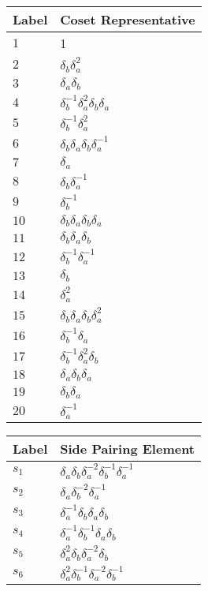 \documentclass{article}
\begin{document}
\begin{center}
\begin{tabular}{ll}
\toprule
Label & Coset Representative\\
\midrule
$1$ & 1 \\
$2$ & $\delta_b^{}\delta_a^{2}$ \\
$3$ & $\delta_a^{}\delta_b^{}$ \\
$4$ & $\delta_b^{-1}\delta_a^{2}\delta_b^{}\delta_a^{}$ \\
$5$ & $\delta_b^{-1}\delta_a^{2}$ \\
$6$ & $\delta_b^{}\delta_a^{}\delta_b^{}\delta_a^{-1}$ \\
$7$ & $\delta_a^{}$ \\
$8$ & $\delta_b^{}\delta_a^{-1}$ \\
$9$ & $\delta_b^{-1}$ \\
$10$ & $\delta_b^{}\delta_a^{}\delta_b^{}\delta_a^{}$ \\
$11$ & $\delta_b^{}\delta_a^{}\delta_b^{}$ \\
$12$ & $\delta_b^{-1}\delta_a^{-1}$ \\
$13$ & $\delta_b^{}$ \\
$14$ & $\delta_a^{2}$ \\
$15$ & $\delta_b^{}\delta_a^{}\delta_b^{}\delta_a^{2}$ \\
$16$ & $\delta_b^{-1}\delta_a^{}$ \\
$17$ & $\delta_b^{-1}\delta_a^{2}\delta_b^{}$ \\
$18$ & $\delta_a^{}\delta_b^{}\delta_a^{}$ \\
$19$ & $\delta_b^{}\delta_a^{}$ \\
$20$ & $\delta_a^{-1}$ \\
\bottomrule
\end{tabular}
\hfill
\begin{tabular}{ll}
\toprule
Label & Side Pairing Element\\
\midrule
$s_{1}$ & $\delta_a^{}\delta_b^{}\delta_a^{-2}\delta_b^{-1}\delta_a^{-1}$ \\
$s_{2}$ & $\delta_a^{}\delta_b^{-2}\delta_a^{-1}$ \\
$s_{3}$ & $\delta_a^{-1}\delta_b^{}\delta_a^{}\delta_b^{}$ \\
$s_{4}$ & $\delta_a^{-1}\delta_b^{-1}\delta_a^{}\delta_b^{}$ \\
$s_{5}$ & $\delta_a^{2}\delta_b^{}\delta_a^{-2}\delta_b^{}$ \\
$s_{6}$ & $\delta_a^{2}\delta_b^{-1}\delta_a^{-2}\delta_b^{-1}$ \\

\end{tabular}
\end{center}
\end{document}
